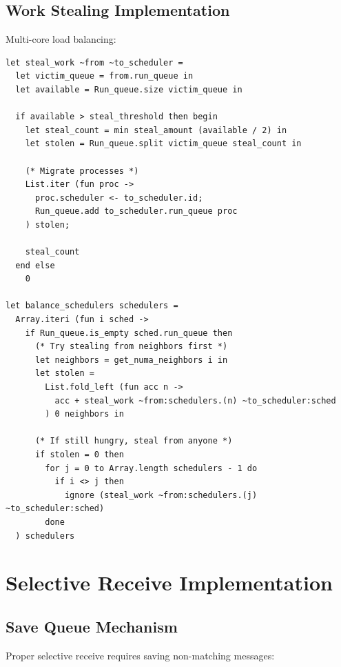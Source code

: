 \documentclass[12pt,a4paper]{report}
\begin{document}
\subsection{Work Stealing Implementation}

Multi-core load balancing:

\begin{lstlisting}
let steal_work ~from ~to_scheduler =
  let victim_queue = from.run_queue in
  let available = Run_queue.size victim_queue in
  
  if available > steal_threshold then begin
    let steal_count = min steal_amount (available / 2) in
    let stolen = Run_queue.split victim_queue steal_count in
    
    (* Migrate processes *)
    List.iter (fun proc ->
      proc.scheduler <- to_scheduler.id;
      Run_queue.add to_scheduler.run_queue proc
    ) stolen;
    
    steal_count
  end else
    0

let balance_schedulers schedulers =
  Array.iteri (fun i sched ->
    if Run_queue.is_empty sched.run_queue then
      (* Try stealing from neighbors first *)
      let neighbors = get_numa_neighbors i in
      let stolen = 
        List.fold_left (fun acc n ->
          acc + steal_work ~from:schedulers.(n) ~to_scheduler:sched
        ) 0 neighbors in
      
      (* If still hungry, steal from anyone *)
      if stolen = 0 then
        for j = 0 to Array.length schedulers - 1 do
          if i <> j then
            ignore (steal_work ~from:schedulers.(j) ~to_scheduler:sched)
        done
  ) schedulers
\end{lstlisting}

\section{Selective Receive Implementation}

\subsection{Save Queue Mechanism}

Proper selective receive requires saving non-matching messages:
\end{document}
